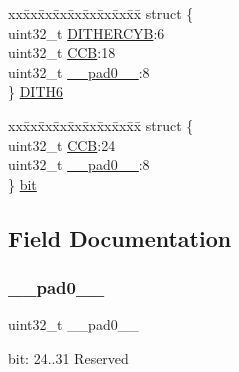 \begin{DoxyCompactItemize}
\begin{tabbing}
\end{tabbing}\item 
\begin{tabbing}
xx\=xx\=xx\=xx\=xx\=xx\=xx\=xx\=xx\=\kill
struct \{\\
\>uint32\_t \mbox{\hyperlink{union_t_c_c___c_c_b___type_a156fbeb3ca1ed9f6622afd99724ad24c}{DITHERCYB}}:6\\
\>uint32\_t \mbox{\hyperlink{union_t_c_c___c_c_b___type_a01afc958e04cff1d06806b323d21d694}{CCB}}:18\\
\>uint32\_t \mbox{\hyperlink{union_t_c_c___c_c_b___type_a3e57c2ef1c3ffb36722f000cc1156824}{\_\_pad0\_\_}}:8\\
\} \mbox{\hyperlink{union_t_c_c___c_c_b___type_a63221881cba0790af493d692eb6707b2}{DITH6}}\\

\end{tabbing}\item 
\begin{tabbing}
xx\=xx\=xx\=xx\=xx\=xx\=xx\=xx\=xx\=\kill
struct \{\\
\>uint32\_t \mbox{\hyperlink{union_t_c_c___c_c_b___type_a01afc958e04cff1d06806b323d21d694}{CCB}}:24\\
\>uint32\_t \mbox{\hyperlink{union_t_c_c___c_c_b___type_a3e57c2ef1c3ffb36722f000cc1156824}{\_\_pad0\_\_}}:8\\
\} \mbox{\hyperlink{union_t_c_c___c_c_b___type_ae2c581dac8a33a583aad061da2992462}{bit}}\\

\end{tabbing}\end{DoxyCompactItemize}


\subsection{Field Documentation}
\mbox{\label{union_t_c_c___c_c_b___type_a3e57c2ef1c3ffb36722f000cc1156824}} 
\subsubsection{\texorpdfstring{\_\_pad0\_\_}{\_\_pad0\_\_}}
{\footnotesize\ttfamily uint32\+\_\+t \+\_\+\+\_\+pad0\+\_\+\+\_\+}

bit\+: 24..31 Reserved \mbox{\label{union_t_c_c___c_c_b___type_aced41115990a4c24baf44581e8d8c6c5}} 
